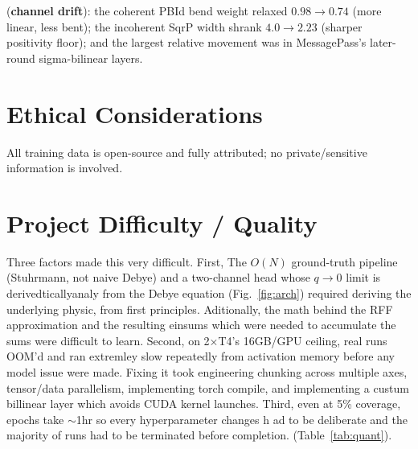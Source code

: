 \documentclass[final]{article}
\begin{document}
(\textbf{channel drift}): the coherent PBId bend weight relaxed $0.98\to0.74$ 
(more linear, less bent);
the incoherent SqrP width shrank $4.0\to2.23$ (sharper positivity floor); and the
largest relative movement was in MessagePass's later-round sigma-bilinear layers.

\section{Ethical Considerations}
All training data is open-source and fully attributed; no private/sensitive
information is involved.

\section{Project Difficulty / Quality}
Three factors  made this very difficult. First, The $O(N)$
ground-truth pipeline (Stuhrmann, not naive Debye) and a two-channel head whose
$q{\to}0$ limit is derivedticallyanaly from the Debye equation
(Fig.~\ref{fig:arch}) required deriving the underlying physic, from first principles. 
Aditionally, the math behind the RFF approximation and the resulting einsums which were 
needed to accumulate the sums were difficult to learn. Second, on 2$\times$T4's 16GB/GPU 
ceiling, real runs OOM'd and ran extremley slow
repeatedly from activation memory  before any model issue were made. 
Fixing it took engineering chunking across multiple axes, tensor/data parallelism,
implementing torch compile, and implementing a custum billinear layer which avoids 
CUDA kernel launches. Third, even at 5\% coverage, epochs take $\sim$1hr
so every hyperparameter changes h ad to be deliberate and the majority of runs had
to be terminated before completion.
(Table~\ref{tab:quant}).

\newpage


\end{document}
